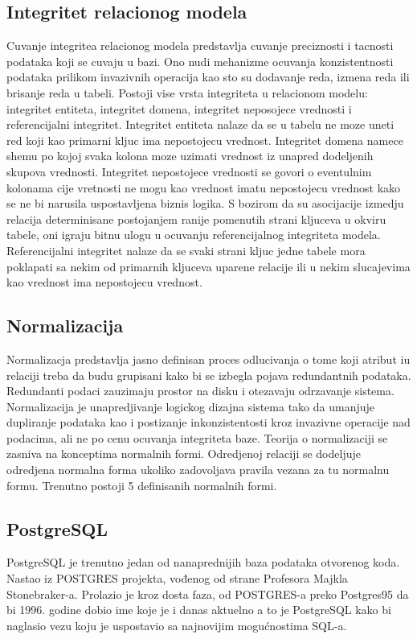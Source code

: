 \documentclass[12pt,oneside]{memoir}
\begin{document}
\subsection{Integritet relacionog modela}
Cuvanje integritea relacionog modela predstavlja cuvanje preciznosti i tacnosti podataka koji se cuvaju u bazi. Ono nudi mehanizme ocuvanja konzistentnosti podataka prilikom invazivnih operacija kao sto su dodavanje reda, izmena reda ili brisanje reda u tabeli. Postoji vise vrsta integriteta u relacionom modelu: integritet entiteta, integritet domena, integritet neposojece vrednosti i referencijalni integritet.
Integritet entiteta nalaze da se u tabelu ne moze uneti red koji kao primarni kljuc ima nepostojecu vrednost. Integritet domena namece shemu po kojoj svaka kolona moze uzimati vrednost iz unapred dodeljenih skupova vrednosti. Integritet nepostojece vrednosti se govori o eventulnim kolonama cije vretnosti ne mogu kao vrednost imatu nepostojecu vrednost kako se ne bi narusila uspostavljena biznis logika. S bozirom da su asocijacije izmedju relacija determinisane postojanjem ranije pomenutih strani kljuceva u okviru tabele, oni igraju bitnu ulogu u ocuvanju referencijalnog integriteta modela. Referencijalni integritet nalaze da se svaki strani kljuc jedne tabele mora poklapati sa nekim od primarnih kljuceva uparene relacije ili u nekim slucajevima kao vrednost ima nepostojecu vrednost.
\subsection{Normalizacija}
Normalizacja predstavlja jasno definisan proces odlucivanja o tome koji atribut iu relaciji treba da budu grupisani kako bi se izbegla pojava redundantnih podataka. Redundanti podaci zauzimaju prostor na disku i otezavaju odrzavanje sistema. Normalizacija je unapredjivanje  logickog dizajna sistema tako da umanjuje dupliranje podataka kao i postizanje inkonzistentosti kroz invazivne operacije nad podacima, ali ne po cenu ocuvanja integriteta baze. Teorija o normalizaciji se zasniva na konceptima normalnih formi. Odredjenoj relaciji se dodeljuje odredjena normalna forma ukoliko zadovoljava pravila vezana za tu normalnu formu. Trenutno postoji 5 definisanih normalnih formi.


\subsection{PostgreSQL}

PostgreSQL je trenutno jedan od nanaprednijih baza podataka otvorenog koda.  Nastao iz POSTGRES projekta, vođenog od strane
Profesora Majkla Stonebraker-a. Prolazio je kroz dosta faza, od POSTGRES-a preko Postgres95 da bi 1996. godine dobio ime koje je i danas aktuelno a to je PostgreSQL kako bi naglasio vezu koju je uspostavio sa najnovijim mogućnostima SQL-a. \cite{PostgresHistory}
\end{document}
